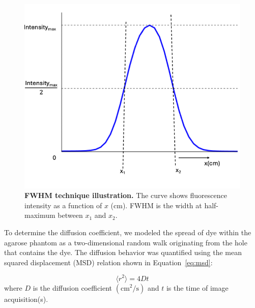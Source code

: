 \begin{figure}
    \vspace{-1em} %
    \hspace{2em}  %
    \begin{minipage}{0.6\textwidth} %
        \centering
        \includegraphics[width=\linewidth]{figures/fwhm_plots.png}
        \captionsetup{justification=raggedright, singlelinecheck=false}
        \caption[FWHM technique]{\textbf{FWHM technique illustration.} The curve shows fluorescence intensity as a function of $x$ (cm). FWHM is the width at half-maximum between $x_1$ and $x_2$.}
        \label{fig:full_width_half_maximum}
        \vspace{1em} %
    \end{minipage}
\end{figure}




To determine the diffusion coefficient, we modeled the spread of dye within the agarose phantom as a
two-dimensional random walk originating from the hole that contains the dye. The diffusion behavior was quantified using the mean squared displacement (MSD) relation shown in Equation~\ref{eq:msd}:

\begin{equation}
\label{eq:msd}
    \langle r^2 \rangle = 4Dt
\end{equation}
where $D$ is the diffusion coefficient $\left( \mathrm{cm}^2/\mathrm{s} \right)$ and $t$ is the time of image 
acquisition(s).

